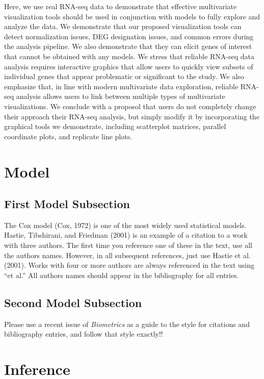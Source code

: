 \documentclass[useAMS,referee]{biom}
\begin{document}
Here, we use real RNA-seq data to demonstrate that effective multivariate visualization tools should be used in conjunction with models to fully explore and analyze the data. We demonstrate that our proposed visualization tools can detect normalization issues, DEG designation issues, and common errors during the analysis pipeline. We also demonstrate that they can elicit genes of interest that cannot be obtained with any models. We stress that reliable RNA-seq data analysis requires interactive graphics that allow users to quickly view subsets of individual genes that appear problematic or significant to the study. We also emphasize that, in line with modern multivariate data exploration, reliable RNA-seq analysis allows users to link between multiple types of multivariate visualizations. We conclude with a proposol that users do not completely change their approach their RNA-seq analysis, but simply modify it by incorporating the graphical tools we demonstrate, including scatterplot matrices, parallel coordinate plots, and replicate line plots.


\section{Model}
\label{s:model}

\subsection{First Model Subsection}

The Cox model (Cox, 1972) is one of the most widely used statistical
models.  Hastie, Tibshirani, and Friedman (2001) is an example of a
citation to a work with three authors.  The first time you reference
one of these in the text, use all the authors names. However, in all
subsequent references, just use Hastie et al. (2001).  Works with four
or more authors are always referenced in the text using ``et al.''
All authors names should appear in the bibliography for all entries.

\subsection{Second Model Subsection}

Please use a recent issue of \textit{Biometrics} as a guide to the style
for citations and bibliography entries, and follow that style exactly!!


\section{Inference}
\label{s:inf}
\end{document}

